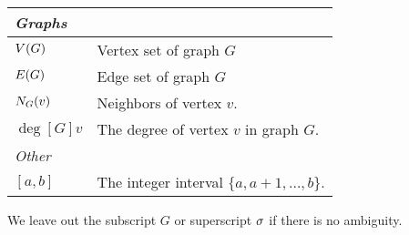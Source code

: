 \begin{centering}
\begin{tabular}{l p{} l}
    \toprule
    \multicolumn{3}{l}{\emph{Graphs}} \\
    \midrule

    $V(G)$ & \multicolumn{2}{l}{Vertex set of graph $G$} \vspace{\tablespace}\\

    $E(G)$ & \multicolumn{2}{l}{Edge set of graph $G$} \vspace{\tablespace}\\

    $\N[G]{v}$ & \multicolumn{2}{l}{Neighbors of vertex $v$.}
    \vspace{\tablespace}\\

    $\deg[G]{v}$ & \multicolumn{2}{p{.815\textwidth}}{The degree of vertex $v$
      in graph $G$.} \vspace{\tablespace}\\

    \toprule
    \multicolumn{3}{l}{\emph{Other}} \\
    \midrule

    $[a,b]$ & \multicolumn{2}{l}{The integer interval $\{a, a+1, \dots, b\}$.}
    \vspace{2\tablespace}
  \end{tabular}
\end{centering}
\hidegame

We leave out the subscript $G$ or superscript $\sigma$ if there is no ambiguity.

